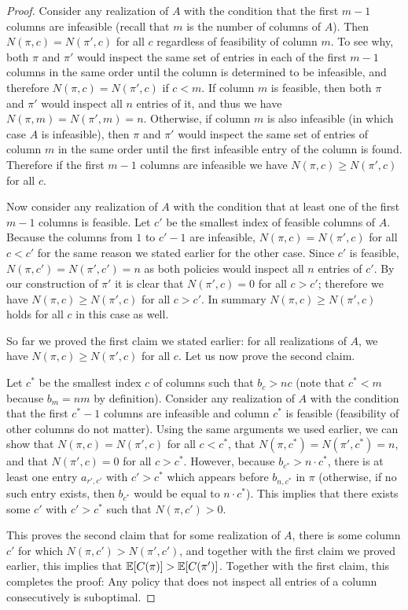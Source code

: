 \begin{proof}
 Consider any realization of $A$ with the condition that the first $m-1$ columns are infeasible (recall that $m$ is the number of columns of $A$).
 Then $N(\pi, c) = N(\pi', c)$ for all $c$ regardless of feasibility of column $m$.
 To see why, both $\pi$ and $\pi'$ would inspect the same set of entries in each of the first $m-1$ columns in the same order until the column is determined to be infeasible, and therefore $N(\pi, c) = N(\pi', c)$ if $c<m$.
 If column $m$ is feasible, then both $\pi$ and $\pi'$ would inspect all $n$ entries of it, and thus we have $N(\pi, m) = N(\pi', m) = n$. Otherwise, if column $m$ is also infeasible (in which case $A$ is infeasible), then $\pi$ and $\pi'$ would inspect the same set of entries of column $m$ in the same order until the first infeasible entry of the column is found. Therefore if the first $m-1$ columns are infeasible we have $N(\pi, c) \geq N(\pi', c)$ for all $c$.

 Now consider any realization of $A$ with the condition that at least one of the first $m-1$ columns is feasible. Let $c'$ be the smallest index of feasible columns of $A$.
 Because the columns from $1$ to $c'-1$ are infeasible, $N(\pi, c) = N(\pi', c)$ for all $c < c'$ for the same reason we stated earlier for the other case. 
 Since $c'$ is feasible, $N(\pi, c') = N(\pi', c') = n$ as both policies would inspect all $n$ entries of $c'$. By our construction of $\pi'$ it is clear that $N(\pi', c) = 0$ for all $c > c'$; therefore we have $N(\pi, c) \geq N(\pi', c)$ for all $c>c'$. In summary $N(\pi, c) \geq N(\pi', c)$ holds for all $c$ in this case as well. 

 So far we proved the first claim we stated earlier: for all realizations of $A$, we have $N(\pi, c) \geq N(\pi', c)$ for all $c$.
 Let us now prove the second claim. 
 
 Let $c^*$ be the smallest index $c$ of columns such that $b_c > nc$ (note that $c^* < m$ because $b_m = nm$ by definition). 
 Consider any realization of $A$ with the condition that the first $c^*-1$ columns are infeasible and column $c^*$ is feasible (feasibility of other columns do not matter). 
 Using the same arguments we used earlier, we can show that $N(\pi, c) = N(\pi', c)$ for all $c < c^*$, that $N(\pi, c^*) = N(\pi', c^*) = n$, and that $N(\pi', c) = 0$ for all $c> c^*$. 
 However, because $b_{c^*} > n \cdot c^*$, there is at least one entry $a_{r',c'}$ with $c' > c^*$ which  appears before $b_{n, c^*}$ in $\pi$ (otherwise, if no such entry exists, then $b_{c^*}$ would be equal to $n \cdot c^*$). This implies that there exists some $c'$ with $c' > c^*$ such that $N(\pi, c') > 0$. 

 This proves the second claim that for some realization of $A$, there is some column $c'$ for which $N(\pi, c') >  N(\pi', c')$, and together with the first claim we proved earlier, this implies that $\mathbb{E}[C(\pi)] > \mathbb{E}[C(\pi')]$. 
 Together with the first claim, this completes the proof: Any policy that does not inspect all entries of a column consecutively is suboptimal.
 \end{proof}
